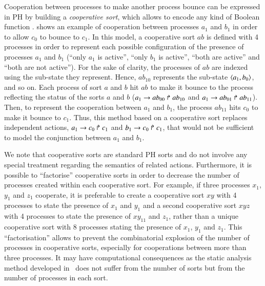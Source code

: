 Cooperation between processes to make another process bounce can be expressed in PH by building a \emph{cooperative sort},
which allows to encode any kind of Boolean function \cite{PMR10-TCSB}.
 shows an example of cooperation between processes $a_1$ and $b_1$
in order to allow $c_0$ to bounce to $c_1$.
In this model, a cooperative sort $ab$ is defined with 4 processes
in order to represent each possible configuration
of the presence of processes $a_1$ and $b_1$
(“only $a_1$ is active”, “only $b_1$ is active”, “both are active” and “both are not active”).
For the sake of clarity, the processes of $ab$ are indexed using the sub-state they represent.
Hence, $ab_{10}$ represents the sub-state $\mbox{$\langle a_1,b_0 \rangle$}$, and so on.
Each process of sort $a$ and $b$ hit $ab$ to make it bounce to the process reflecting the status of the sorts $a$ and $b$
(\eg $a_1\rightarrow ab_{00}\Rsh ab_{10}$ and $a_1\rightarrow ab_{01}\Rsh ab_{11}$).
Then, to represent the cooperation between $a_1$ and $b_1$, the process $ab_{11}$ hits $c_0$ to make it bounce to $c_1$.
Thus, this method based on a cooperative sort
replaces independent actions, \eg $a_1\rightarrow c_0\Rsh c_1$ and $b_1\rightarrow c_0\Rsh c_1$,
that would not be sufficient to model the conjunction
between $a_1$ and $b_1$.

We note that cooperative sorts are standard PH sorts and do not involve any
special treatment regarding the semantics of related actions.
Furthermore, it is possible to “factorise” cooperative sorts in order to decrease the number of processes created within each cooperative sort.
For example, if three processes $x_1$, $y_1$ and $z_1$ cooperate,
it is preferable to create a cooperative sort $xy$ with 4 processes to state the presence of $x_1$ and $y_1$
and a second cooperative sort $xyz$ with 4 processes to state the presence of $xy_{11}$ and $z_1$,
rather than a unique cooperative sort with 8 processes stating the presence of $x_1$, $y_1$ and $z_1$.
This “factorisation” allows to prevent the combinatorial explosion of the number of processes in cooperative sorts,
especially for cooperations between more than three processes.
It may have computational consequences as the static analysis method developed in~ does not suffer from the number of sorts but from the number of processes in each sort.



\label{ssec:priorities}

